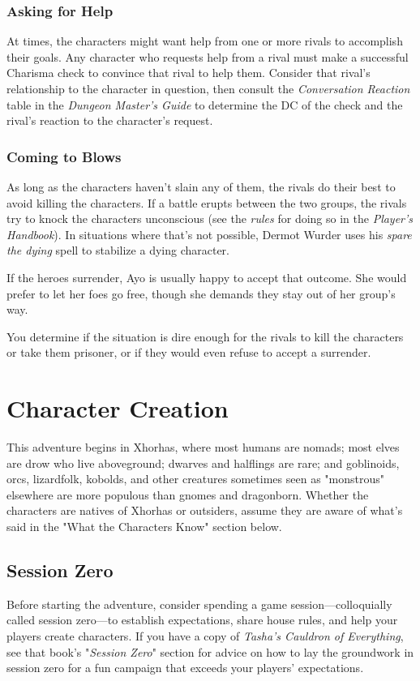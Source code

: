 \documentclass[10pt,a4paper,twoside,bg=print,twocolumn,openany,nodeprecatedcode]{dndbook}
\begin{document}
\subsubsection{Asking for Help}
At times, the characters might want help from one or more rivals to accomplish their goals. Any character who requests help from a rival must make a successful Charisma check to convince that rival to help them. Consider that rival's relationship to the character in question, then consult the \textit{Conversation Reaction} table in the \textit{Dungeon Master's Guide} to determine the DC of the check and the rival's reaction to the character's request.

\subsubsection{Coming to Blows}
As long as the characters haven't slain any of them, the rivals do their best to avoid killing the characters. If a battle erupts between the two groups, the rivals try to knock the characters unconscious (see the \textit{rules} for doing so in the \textit{Player's Handbook}). In situations where that's not possible, Dermot Wurder uses his \textit{spare the dying} spell to stabilize a dying character.

If the heroes surrender, Ayo is usually happy to accept that outcome. She would prefer to let her foes go free, though she demands they stay out of her group's way.

You determine if the situation is dire enough for the rivals to kill the characters or take them prisoner, or if they would even refuse to accept a surrender.

\section{Character Creation}
This adventure begins in Xhorhas, where most humans are nomads; most elves are drow who live aboveground; dwarves and halflings are rare; and goblinoids, orcs, lizardfolk, kobolds, and other creatures sometimes seen as "monstrous" elsewhere are more populous than gnomes and dragonborn. Whether the characters are natives of Xhorhas or outsiders, assume they are aware of what's said in the "What the Characters Know" section below.

\subsection{Session Zero}
Before starting the adventure, consider spending a game session—colloquially called session zero—to establish expectations, share house rules, and help your players create characters. If you have a copy of \textit{Tasha's Cauldron of Everything}, see that book's "\textit{Session Zero}" section for advice on how to lay the groundwork in session zero for a fun campaign that exceeds your players' expectations.
\end{document}
